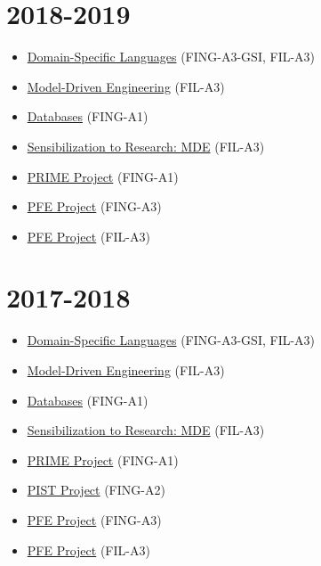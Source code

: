 \hypertarget{section-4}{%
\section{2018-2019}\label{section-4}}

\begin{itemize}
\tightlist
\item
  \href{https://campusneo.mines-nantes.fr/campus/course/view.php?id=1767}{Domain-Specific
  Languages} (FING-A3-GSI, FIL-A3)
\item
  \href{https://campusneo.mines-nantes.fr/campus/course/view.php?id=1777}{Model-Driven
  Engineering} (FIL-A3)
\item
  \href{https://formations.imt-atlantique.fr/bd_ihm}{Databases}
  (FING-A1)
\item
  \href{https://campusneo.mines-nantes.fr/campus/course/view.php?id=1532}{Sensibilization
  to Research: MDE} (FIL-A3)
\item
  \href{https://campusneo.mines-nantes.fr/campus/course/view.php?id=621}{PRIME
  Project} (FING-A1)
\item
  \href{https://campusneo.mines-nantes.fr/campus/course/view.php?id=1540}{PFE
  Project} (FING-A3)
\item
  \href{https://campusneo.mines-nantes.fr/campus/course/view.php?id=1344}{PFE
  Project} (FIL-A3)
\end{itemize}

\hypertarget{section-5}{%
\section{2017-2018}\label{section-5}}

\begin{itemize}
\tightlist
\item
  \href{https://campusneo.mines-nantes.fr/campus/course/view.php?id=1687}{Domain-Specific
  Languages} (FING-A3-GSI, FIL-A3)
\item
  \href{https://campusneo.mines-nantes.fr/campus/course/view.php?id=1688}{Model-Driven
  Engineering} (FIL-A3)
\item
  \href{https://campusneo.mines-nantes.fr/campus/course/view.php?id=1679}{Databases}
  (FING-A1)
\item
  \href{https://campusneo.mines-nantes.fr/campus/course/view.php?id=1532}{Sensibilization
  to Research: MDE} (FIL-A3)
\item
  \href{https://campusneo.mines-nantes.fr/campus/course/view.php?id=621}{PRIME
  Project} (FING-A1)
\item
  \href{https://campusneo.mines-nantes.fr/campus/course/view.php?id=115}{PIST
  Project} (FING-A2)
\item
  \href{https://campusneo.mines-nantes.fr/campus/course/view.php?id=1540}{PFE
  Project} (FING-A3)
\item
  \href{https://campusneo.mines-nantes.fr/campus/course/view.php?id=1344}{PFE
  Project} (FIL-A3)
\end{itemize}

